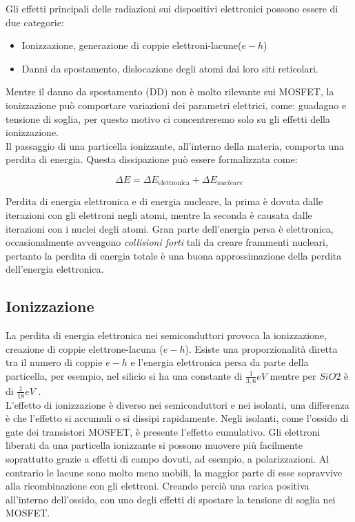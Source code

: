 
Gli effetti principali delle radiazioni sui dispositivi elettronici possono essere di due categorie\cite{bib:Effetti_Radiazioni_1987}:
\begin{itemize}
	\item Ionizzazione, generazione di coppie elettroni-lacune($e-h$)
	\item Danni da spostamento, dislocazione degli atomi dai loro siti reticolari.
\end{itemize}
Mentre il danno da spostamento (DD) non è molto rilevante sui MOSFET, la ionizzazione può comportare variazioni dei parametri elettrici, come: guadagno e tensione di soglia, per questo motivo ci concentreremo solo su gli effetti della ionizzazione.
\\

Il passaggio di una particella ionizzante, all'interno della materia, comporta una perdita di energia. Questa dissipazione può essere formalizzata come:

$$ \Delta E = \Delta E_{\text{elettronica}} + \Delta E_{nucleare} $$

Perdita di energia elettronica e di energia nucleare, la prima è dovuta dalle iterazioni con gli elettroni negli atomi, mentre la seconda è causata dalle iterazioni con i nuclei degli atomi.
Gran parte dell'energia persa è elettronica, occasionalmente avvengono \textit{collisioni forti} tali da creare frammenti nucleari, pertanto la perdita di energia totale è una buona approssimazione della perdita dell'energia elettronica\cite{bib:Effetti_Radiazioni_NASA}.
\\

\subsection{Ionizzazione}
La perdita di energia elettronica nei semiconduttori provoca la ionizzazione, creazione di coppie elettrone-lacuna ($e-h$). Esiste una proporzionalità diretta tra il numero di coppie $e-h$ e l'energia elettronica persa da parte della particella, per esempio, nel silicio si ha una constante di $\frac{1}{3,6}eV$ mentre per $SiO2$ è di $\frac{1}{18}eV$ \cite{bib:Effetti_Radiazioni_NASA}.
\\

L'effetto di ionizzazione è diverso nei semiconduttori e nei isolanti, una differenza è che l'effetto si accumuli o si dissipi rapidamente.
Negli isolanti, come l'ossido di gate dei transistori MOSFET, è presente l'effetto cumulativo. Gli elettroni liberati da una particella ionizzante si possono muovere più facilmente soprattutto grazie a effetti di campo dovuti, ad esempio, a polarizzazioni.
Al contrario le lacune sono molto meno mobili, la maggior parte di esse sopravvive alla ricombinazione con gli elettroni. Creando perciò una carica positiva all'interno dell'ossido, con uno degli effetti di spostare la tensione di soglia nei MOSFET.
\\

